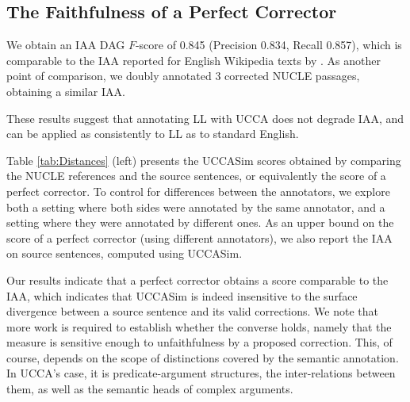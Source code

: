 \documentclass[letterpaper, 11pt]{article}
\begin{document}
%
%
%
\subsection{The Faithfulness of a Perfect Corrector}
We obtain an IAA DAG $F$-score of 0.845
(Precision 0.834, Recall 0.857), which
is comparable to the IAA reported for English Wikipedia texts by \cite{abend2013universal}.
As another point of comparison, we doubly annotated 3 corrected
NUCLE passages, obtaining a similar IAA.

These results suggest that annotating LL with UCCA does not degrade IAA, and can be applied as consistently to LL as to standard English.

Table \ref{tab:Distances} (left)
presents the {\sc UCCASim} scores obtained by comparing the NUCLE references and the source
sentences, or equivalently the score of a perfect corrector.
To control for differences between the annotators, we explore both
a setting where both sides were annotated by the same annotator,
and a setting where they were annotated by different ones.
As an upper bound on the score of a perfect corrector (using different annotators),
we also report the IAA on source sentences, computed using {\sc UCCASim}. 

Our results indicate that a perfect corrector obtains a score comparable
to the IAA, which indicates that {\sc UCCASim} is indeed
insensitive to the surface divergence between a source sentence and its valid corrections.
We note that more work is required to establish whether the converse holds, namely
that the measure is sensitive enough
to unfaithfulness by a proposed correction.
This, of course, depends on the scope of distinctions covered by the semantic annotation.
In UCCA's case, it is predicate-argument structures, the inter-relations between them,
as well as the semantic heads of complex arguments.
\end{document}
